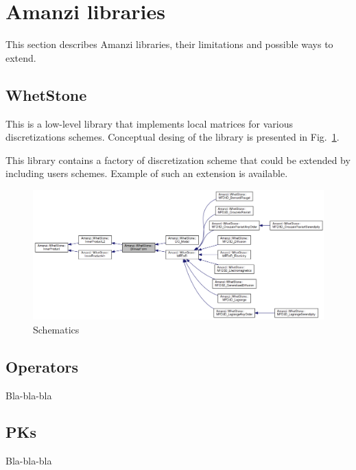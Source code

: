 \section{Amanzi libraries}

This section describes Amanzi libraries, their limitations and possible 
ways to extend.

\subsection{WhetStone}
This is a low-level library that implements local matrices for various 
discretizations schemes. 
Conceptual desing of the library is presented in Fig.~\ref{whetstone}.

This library contains a factory of discretization scheme that could
be extended by including users schemes.
Example of such an extension is available.


\begin{figure}[h!]
\includegraphics[width=1.0\textwidth]{figs/whetstone.png}
\caption{Schematics\label{whetstone}}
\end{figure}

\subsection{Operators}

Bla-bla-bla

\subsection{PKs}

Bla-bla-bla

